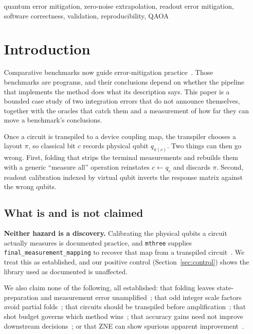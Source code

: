 \documentclass[10pt,conference]{IEEEtran}
\newcommand{\code}[1]{\texttt{\small #1}}
\begin{document}
\begin{IEEEkeywords}
quantum error mitigation, zero-noise extrapolation, readout error mitigation, software correctness,
validation, reproducibility, QAOA
\end{IEEEkeywords}

\section{Introduction}
Comparative benchmarks now guide error-mitigation practice~\cite{cai2023review,bultrini2023,russo2023}.
Those benchmarks are programs, and their conclusions depend on whether the pipeline that implements
the method does what its description says. This paper is a bounded case study of two integration
errors that do not announce themselves, together with the oracles that catch them and a measurement
of how far they can move a benchmark's conclusions.

Once a circuit is transpiled to a device coupling map, the transpiler chooses a layout $\pi$, so
classical bit $c$ records physical qubit $q_{\pi(c)}$. Two things can then go wrong. First, folding
that strips the terminal measurements and rebuilds them with a generic ``measure all'' operation
reinstates $c\leftarrow q_c$ and discards $\pi$. Second, readout calibration indexed by virtual qubit
inverts the response matrix against the wrong qubits.

\subsection*{What is and is not claimed}
\textbf{Neither hazard is a discovery.} Calibrating the physical qubits a circuit actually measures
is documented practice, and \code{mthree} supplies \code{final\_measurement\_mapping} to recover that
map from a transpiled circuit~\cite{nation2021}. We treat this as established, and our positive
control (Section~\ref{sec:control}) shows the library used as documented is unaffected.

\noindent We also claim none of the following, all established: that folding leaves state-preparation
and measurement error unamplified~\cite{majumdar2023}; that odd integer scale factors avoid partial
folds~\cite{majumdar2023}; that circuits should be transpiled before amplification~\cite{majumdar2023};
that shot budget governs which method wins~\cite{bultrini2023}; that accuracy gains need not improve
downstream decisions~\cite{scavino2026decision}; or that ZNE can show spurious apparent
improvement~\cite{koester2026}.
\end{document}
